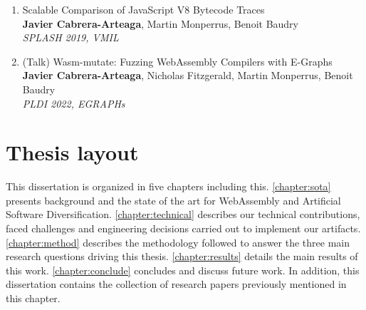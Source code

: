 \begin{enumerate}
    \item Scalable Comparison of JavaScript V8 Bytecode Traces \cite{STRAC}\\
    {\small\textbf{Javier Cabrera-Arteaga}, Martin Monperrus, Benoit Baudry}\\
    \emph{SPLASH 2019, VMIL}\\
    \item (Talk) Wasm-mutate: Fuzzing WebAssembly Compilers with E-Graphs\\
    \textbf{Javier Cabrera-Arteaga}, Nicholas Fitzgerald, Martin Monperrus, Benoit Baudry\\
    \emph{PLDI 2022, EGRAPHs}\\
\end{enumerate}

\section*{Thesis layout}

This dissertation is organized in five chapters including this. \autoref{chapter:sota} presents background and the state of the art for WebAssembly and Artificial Software Diversification.
\autoref{chapter:technical} describes our technical contributions, faced challenges and engineering decisions carried out to implement our artifacts. \autoref{chapter:method} describes the methodology followed to answer the three main
research questions driving this thesis. \autoref{chapter:results} details the main results of this work. \autoref{chapter:conclude} concludes and discuss future work. 
In addition, this dissertation contains the collection of research papers previously mentioned in this chapter.